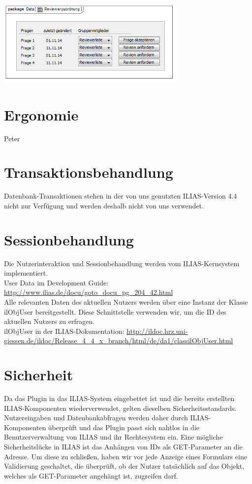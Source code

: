 \documentclass[a4paper]{scrreprt}
\begin{document}
\label{Grafische Benutzeroberfläche Review}
\\
\includegraphics[width=0.7\textwidth]{User_Interface_Modeling_Diagram__Reviewerzuordnung.png}
\label{Grafische Benutzeroberfläche Autor}
\section{Ergonomie}
\flushleft
{Peter}
\section{Transaktionsbehandlung}
Datenbank-Transaktionen stehen in der von uns genutzten ILIAS-Version 4.4 nicht zur Verfügung und werden deshalb nicht von uns verwendet.
\section{Sessionbehandlung}
Die Nutzerinteraktion und Sessionbehandlung werden vom ILIAS-Kernsystem implementiert.\\
User Data im Development Guide: \url{http://www.ilias.de/docu/goto_docu_pg_204_42.html}\\
Alle relevanten Daten des aktuellen Nutzers werden über eine Instanz der Klasse ilObjUser bereitgestellt. Diese Schnittstelle verwenden wir, um die ID des aktuellen Nutzers zu erfragen.\\
ilObjUser in der ILIAS-Dokumentation: \url{http://ildoc.hrz.uni-giessen.de/ildoc/Release_4_4_x_branch/html/de/da1/classilObjUser.html}
\section{Sicherheit}
Da das Plugin in das ILIAS-System eingebettet ist und die bereits erstellten ILIAS-Komponenten wiederverwendet, gelten dieselben Sicherheitsstandards. Nutzereingaben und Datenbankabfragen werden daher durch ILIAS-Komponenten überprüft und das Plugin passt sich nahtlos in die Benutzerverwaltung von ILIAS und ihr Rechtesystem ein. Eine mögliche Sicherheitslücke in ILIAS ist das Anhängen von IDs als GET-Parameter an die Adresse. Um diese zu schließen, haben wir vor jede Anzeige eines Formulars eine Validierung geschaltet, die überprüft, ob der Nutzer tatsächlich auf das Objekt, welches als GET-Parameter angehängt ist, zugreifen darf. 
\end{document}
